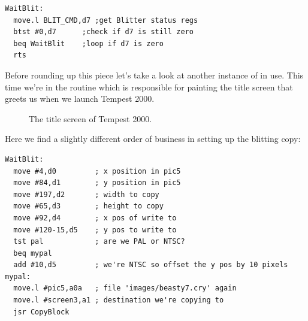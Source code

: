 \begin{lstlisting}[escapechar=\%]
WaitBlit:
  move.l BLIT_CMD,d7 ;get Blitter status regs
  btst #0,d7      ;check if d7 is still zero
  beq WaitBlit    ;loop if d7 is zero
  rts
\end{lstlisting}

Before rounding up this piece let's take a look at another instance of  in use. This time we're in the 
routine which is responsible for painting the title screen that greets us when we launch Tempest 2000.

\begin{figure}[H]
    \centering
    \begin{adjustbox}{width=8cm,center}
    \end{adjustbox}
\caption{The title screen of Tempest 2000.}
\end{figure}

Here we find a slightly different order of business in setting up the blitting copy:

\begin{lstlisting}[escapechar=\%]
WaitBlit:
  move #4,d0         ; x position in pic5
  move #84,d1        ; y position in pic5
  move #197,d2       ; width to copy
  move #65,d3        ; height to copy
  move #92,d4        ; x pos of write to
  move #120-15,d5    ; y pos to write to
  tst pal            ; are we PAL or NTSC?
  beq mypal
  add #10,d5         ; we're NTSC so offset the y pos by 10 pixels
mypal:
  move.l #pic5,a0a   ; file 'images/beasty7.cry' again
  move.l #screen3,a1 ; destination we're copying to
  jsr CopyBlock  
\end{lstlisting}

